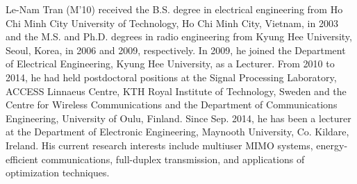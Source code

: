\begin{IEEEbiography}{Le-Nam Tran}
	(M'10) received the B.S. degree in electrical engineering from Ho Chi Minh City University of Technology, Ho Chi Minh City, Vietnam, in 2003 and the M.S. and Ph.D. degrees in radio engineering from Kyung Hee University, Seoul, Korea, in 2006 and 2009, respectively. In 2009, he joined the Department of Electrical Engineering, Kyung Hee University, as a Lecturer. From 2010 to 2014, he had held postdoctoral positions at the Signal Processing Laboratory, ACCESS Linnaeus Centre, KTH Royal Institute of Technology, Sweden and the Centre for Wireless Communications and the Department of Communications Engineering, University of Oulu, Finland. Since Sep. 2014, he has been a lecturer at the Department of Electronic Engineering, Maynooth University, Co. Kildare, Ireland. His current research interests include multiuser MIMO systems, energy-efficient communications, full-duplex transmission, and applications of optimization techniques.
\end{IEEEbiography}
